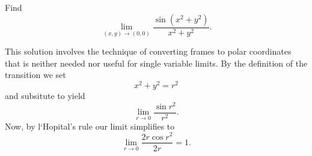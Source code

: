\begin{example}
    Find
    \[\lim_{(x, y) \to (0, 0)} \frac{\sin\left(x^{2} + y^{2}\right)}{x^{2} + y^{2}}.\]

    \begin{soln}
        This solution involves the technique of converting frames to polar coordinates that is neither needed nor useful for single variable limits. By the definition of the transition we set
        \[x^{2} + y^{2} = r^{2}\]
        and subsitute to yield
        \[\lim_{r \to 0} \frac{\sin r^{2}}{r^{2}}.\]
        Now, by l`Hopital's rule our limit simplifies to
        \[\lim_{r \to 0} \frac{2r \cos r^{2}}{2r} = 1.\]
    \end{soln}
\end{example}